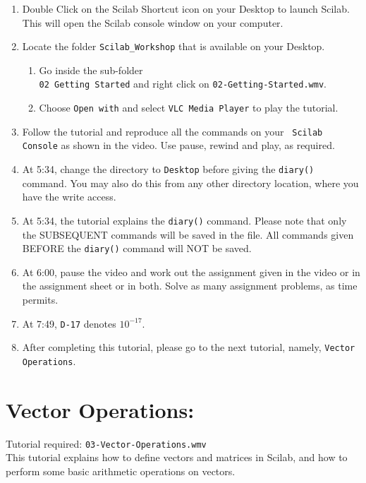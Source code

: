 \documentclass[11pt]{article}
\newenvironment{enumcpt}{\begin{enumerate} \topsep 0pt \partopsep 0pt 
                        \parsep 0pt
                        \itemsep 0pt \leftmargin -1in \rightmargin 0pt
                        }{\end{enumerate}}
\begin{document}
\begin{multicols}{2}
\begin{enumcpt}
\item Double Click on the Scilab Shortcut icon on your Desktop to
  launch Scilab.  This will open the Scilab console window on your
  computer. 
\item Locate the folder {\tt Scilab\_Workshop} that is available on
  your Desktop.  
  \begin{enumcpt}
  \item Go inside the sub-folder \\ {\tt 02 Getting Started} and right
    click on {\tt 02-Getting-Started.wmv}.
  \item Choose {\tt Open with} and select {\tt VLC
    Media Player} to play the tutorial.
\end{enumcpt}
\item Follow the tutorial and reproduce all the commands on your {\tt
    Scilab Console} as shown in the video.  Use pause, rewind and
  play, as required.
\item At 5:34, change the directory to {\tt Desktop} before giving the
  {\tt diary()} command.  You may also do this from
  any other directory location, where you have the write access.
\item At 5:34, the tutorial explains the {\tt diary()} command.
  Please note that only the SUBSEQUENT commands will be saved in the
  file.  All commands given BEFORE the {\tt diary()} command will NOT be
  saved. 
\item At 6:00, pause the video and work out the assignment given in
  the video or in the assignment sheet or in both.
  Solve as many assignment problems, as time permits.
\item At 7:49, {\tt D-17} denotes $10^{-17}$.
\item After completing this tutorial, please go to the next tutorial,
  namely, {\tt Vector Operations}.

\end{enumcpt}

\section{Vector Operations:}
Tutorial required: {\tt 03-Vector-Operations.wmv}
\\
This tutorial explains how to define vectors and matrices in Scilab,
and how to perform some basic arithmetic operations on vectors. 
 

\end{multicols}
\end{document}

